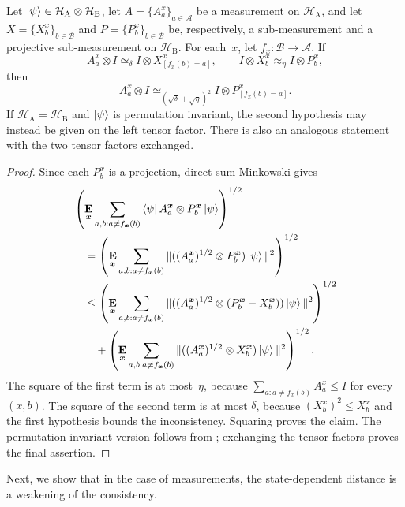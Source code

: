 \documentclass[11pt]{article}
\theoremstyle{definition}
\newcommand{\E}{\mathop{\bf E\/}}
\newcommand{\calA}{\mathcal{A}}
\newcommand{\calB}{\mathcal{B}}
\newcommand{\calH}{\mathcal{H}}
\newcommand{\bx}{{\boldsymbol{x}}}
\begin{document}
\begin{proposition}
\label{prop:round-right-submeasurement}
Let $\ket\psi\in\calH_{\mathrm A}\otimes\calH_{\mathrm B}$, let
$A=\{A^x_a\}_{a\in\calA}$ be a measurement on $\calH_{\mathrm A}$,
and let $X=\{X^x_b\}_{b\in\calB}$ and
$P=\{P^x_b\}_{b\in\calB}$ be, respectively, a sub-measurement and a
projective sub-measurement on $\calH_{\mathrm B}$.  For each~$x$, let
$f_x:\calB\to\calA$.  If
\[
A^x_a\otimes I\simeq_\delta I\otimes X^x_{[f_x(b)=a]},
\qquad
I\otimes X^x_b\approx_\eta I\otimes P^x_b,
\]
then
\[
A^x_a\otimes I
\simeq_{(\sqrt\delta+\sqrt\eta)^2}
I\otimes P^x_{[f_x(b)=a]}.
\]
If $\calH_{\mathrm A}=\calH_{\mathrm B}$ and $\ket\psi$ is
permutation invariant, the second hypothesis may instead be given on
the left tensor factor.  There is also an analogous statement with
the two tensor factors exchanged.
\end{proposition}
\begin{proof}
Since each $P^x_b$ is a projection, direct-sum Minkowski gives
\begin{align*}
&\left(\E_\bx\sum_{a,b:a\ne f_\bx(b)}
\bra\psi A^{\bx}_a\otimes P^{\bx}_b\ket\psi\right)^{1/2}\\
&\quad=\left(\E_\bx\sum_{a,b:a\ne f_\bx(b)}
\|((A^{\bx}_a)^{1/2}\otimes P^{\bx}_b)\ket\psi\|^2\right)^{1/2}\\
&\quad\leq
\left(\E_\bx\sum_{a,b:a\ne f_\bx(b)}
\|((A^{\bx}_a)^{1/2}\otimes(P^{\bx}_b-X^{\bx}_b))\ket\psi\|^2\right)^{1/2}\\
&\qquad+
\left(\E_\bx\sum_{a,b:a\ne f_\bx(b)}
\|((A^{\bx}_a)^{1/2}\otimes X^{\bx}_b)\ket\psi\|^2\right)^{1/2}.
\end{align*}
The square of the first term is at most~$\eta$, because
$\sum_{a:a\ne f_x(b)}A^x_a\leq I$ for every~$(x,b)$.  The square of
the second term is at most
$\delta$, because $(X^x_b)^2\leq X^x_b$ and the first hypothesis
bounds the inconsistency.  Squaring proves the claim.
The permutation-invariant version follows from
; exchanging the tensor factors
proves the final assertion.
\end{proof}

Next, we show that in the case of measurements,
the state-dependent distance is a weakening of the consistency.
\end{document}
